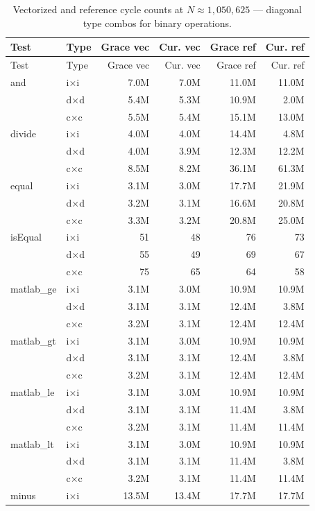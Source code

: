 \begin{longtable}{l l r r r r}
\caption{Vectorized and reference cycle counts at $N \approx 1{,}050{,}625$ — diagonal type combos for binary operations.}
\label{tab:cycles-binary} \\
\toprule
Test & Type & Grace vec & Cur. vec & Grace ref & Cur. ref \\
\midrule
\endfirsthead
\toprule
Test & Type & Grace vec & Cur. vec & Grace ref & Cur. ref \\
\midrule
\endhead
  and & i×i & 7.0M & 7.0M & 11.0M & 11.0M \\
   & d×d & 5.4M & 5.3M & 10.9M & 2.0M \\
   & c×c & 5.5M & 5.4M & 15.1M & 13.0M \\
\midrule
  divide & i×i & 4.0M & 4.0M & 14.4M & 4.8M \\
   & d×d & 4.0M & 3.9M & 12.3M & 12.2M \\
   & c×c & 8.5M & 8.2M & 36.1M & 61.3M \\
\midrule
  equal & i×i & 3.1M & 3.0M & 17.7M & 21.9M \\
   & d×d & 3.2M & 3.1M & 16.6M & 20.8M \\
   & c×c & 3.3M & 3.2M & 20.8M & 25.0M \\
\midrule
  isEqual & i×i & 51 & 48 & 76 & 73 \\
   & d×d & 55 & 49 & 69 & 67 \\
   & c×c & 75 & 65 & 64 & 58 \\
\midrule
  matlab\_ge & i×i & 3.1M & 3.0M & 10.9M & 10.9M \\
   & d×d & 3.1M & 3.1M & 12.4M & 3.8M \\
   & c×c & 3.2M & 3.1M & 12.4M & 12.4M \\
\midrule
  matlab\_gt & i×i & 3.1M & 3.0M & 10.9M & 10.9M \\
   & d×d & 3.1M & 3.1M & 12.4M & 3.8M \\
   & c×c & 3.2M & 3.1M & 12.4M & 12.4M \\
\midrule
  matlab\_le & i×i & 3.1M & 3.0M & 10.9M & 10.9M \\
   & d×d & 3.1M & 3.1M & 11.4M & 3.8M \\
   & c×c & 3.2M & 3.1M & 11.4M & 11.4M \\
\midrule
  matlab\_lt & i×i & 3.1M & 3.0M & 10.9M & 10.9M \\
   & d×d & 3.1M & 3.1M & 11.4M & 3.8M \\
   & c×c & 3.2M & 3.1M & 11.4M & 11.4M \\
\midrule
  minus & i×i & 13.5M & 13.4M & 17.7M & 17.7M \\

\end{longtable}
